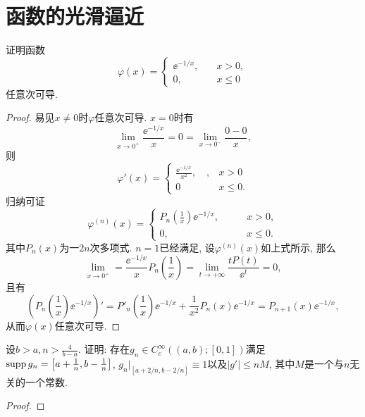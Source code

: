 \section{函数的光滑逼近}
\begin{quiza}
\woe 证明函数\[\varphi(x)=\begin{cases}
\ee^{-1/x},\quad &x>0,\\
0,&x\leqslant 0
\end{cases}\]任意次可导.
\begin{proof}
易见\(x\ne 0\)时\(\varphi\)任意次可导. \(x=0\)时有\[\lim_{x\rightarrow 0^+}\frac{\ee^{-1/x}}{x}=0=\lim_{x\rightarrow 0^-}\frac{0-0}{x},\]则\[\varphi'(x)=\begin{cases}
\frac{\ee^{-1/x}}{x^2},\quad,&x>0\\
0&x\leqslant 0.
\end{cases}\]归纳可证\[\varphi^{(n)}(x)=\begin{cases}
P_n\left(\frac{1}{x}\right)\ee^{-1/x},\qquad &x>0,\\
0,&x\leqslant 0.
\end{cases}\]其中\(P_n(x)\)为一\(2n\)次多项式. \(n=1\)已经满足, 设\(\varphi^{(n)}(x)\)如上式所示, 那么\[\lim_{x\rightarrow 0^+}=\frac{\ee^{-1/x}}{x}P_n\left(\frac{1}{x}\right)=\lim_{t\rightarrow+\infty}\frac{tP(t)}{\ee^t}=0,\]且有\[\left(P_n\left(\frac{1}{x}\right)\ee^{-1/x}\right)'=P'_n\left(\frac{1}{x}\right)\ee^{-1/x}+\frac{1}{x^2}P_n(x)\ee^{-1/x}=P_{n+1}(x)\ee^{-1/x},\]从而\(\varphi(x)\)任意次可导.
\end{proof}
\woe 设\(b>a,n>\frac{4}{b-a}\). 证明: 存在\(g_n\in C_c^{\infty}\left((a,b);[0,1]\right)\)满足\(\mathrm{supp}\, g_n=\left[a+\frac{1}{n},b-\frac{1}{n}\right]\), \(g_n\big|_{\left[a+2/n,b-2/n\right]}\equiv 1\)以及\(|g'|\leqslant nM\), 其中\(M\)是一个与\(n\)无关的一个常数.
\begin{proof}


\end{proof}
\end{quiza}
